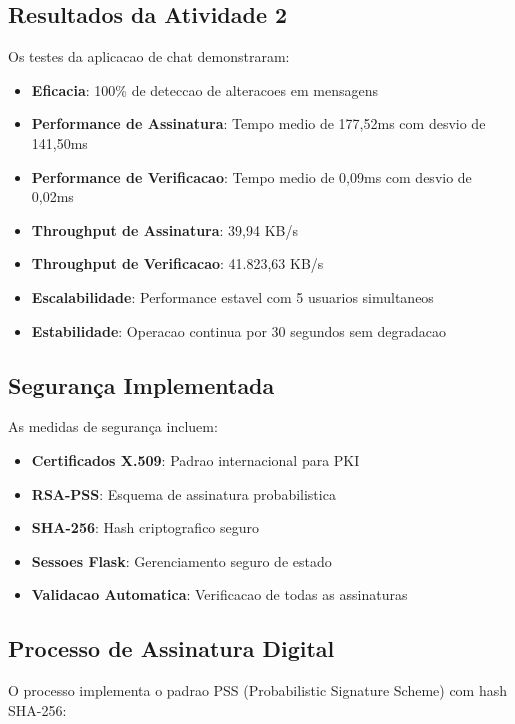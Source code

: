 \documentclass[12pt,a4paper,oneside]{article}
\begin{document}
\subsection{Resultados da Atividade 2}

Os testes da aplicacao de chat demonstraram:

\begin{itemize}
    \item \textbf{Eficacia}: 100\% de deteccao de alteracoes em mensagens
    \item \textbf{Performance de Assinatura}: Tempo medio de 177,52ms com desvio de 141,50ms
    \item \textbf{Performance de Verificacao}: Tempo medio de 0,09ms com desvio de 0,02ms
    \item \textbf{Throughput de Assinatura}: 39,94 KB/s
    \item \textbf{Throughput de Verificacao}: 41.823,63 KB/s
    \item \textbf{Escalabilidade}: Performance estavel com 5 usuarios simultaneos
    \item \textbf{Estabilidade}: Operacao continua por 30 segundos sem degradacao
\end{itemize}

\subsection{Segurança Implementada}

As medidas de segurança incluem:

\begin{itemize}
    \item \textbf{Certificados X.509}: Padrao internacional para PKI
    \item \textbf{RSA-PSS}: Esquema de assinatura probabilistica
    \item \textbf{SHA-256}: Hash criptografico seguro
    \item \textbf{Sessoes Flask}: Gerenciamento seguro de estado
    \item \textbf{Validacao Automatica}: Verificacao de todas as assinaturas
\end{itemize}

\subsection{Processo de Assinatura Digital}

O processo implementa o padrao PSS (Probabilistic Signature Scheme) com hash SHA-256:
\end{document}
